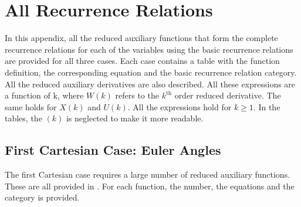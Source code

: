 \chapter{All Recurrence Relations}
\label{app:appendixD-allRecurrenceRelations}
In this appendix, all the reduced auxiliary functions that form the complete recurrence relations for each of the variables using the basic recurrence relations are provided for all three cases. Each case contains a table with the function definition, the corresponding equation and the basic recurrence relation category. All the reduced auxiliary derivatives are also described. All these expressions are a function of k, where $W\left(k\right)$ refers to the $k^{\text{th}}$ order reduced derivative. The same holds for $X\left(k\right)$ and $U\left(k\right)$. All the expressions hold for $k\geq1$. In the tables, the $\left(k\right)$ is neglected to make it more readable.

\section{First Cartesian Case: Euler Angles}
\label{sec:firCartApp}
The first Cartesian case requires a large number of reduced auxiliary functions. These are all provided in . For each function, the number, the equations and the category is provided.


